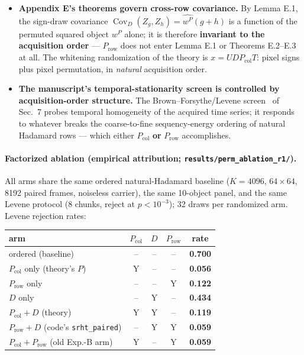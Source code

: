 \begin{itemize}
\item \textbf{Appendix E's theorems govern cross-row covariance.} By Lemma E.1, the sign-draw covariance $\operatorname{Cov}_D(Z_g,Z_h)=\widehat{w^P}(g+h)$ is a function of the permuted squared object $w^P$ alone; it is therefore \textbf{invariant to the acquisition order} --- $P_{\mathrm{row}}$ does not enter Lemma E.1 or Theorems E.2--E.3 at all. The whitening randomization of the theory is $x=UDP_{\mathrm{col}}T$: pixel signs plus pixel permutation, in \emph{natural} acquisition order.
\item \textbf{The manuscript's temporal-stationarity screen is controlled by acquisition-order structure.} The Brown--Forsythe/Levene screen~\cite{BrownForsythe1974,Levene1960} of Sec.~7 probes temporal homogeneity of the acquired time series; it responds to whatever breaks the coarse-to-fine sequency-energy ordering of natural Hadamard rows --- which either $P_{\mathrm{col}}$ \textbf{or} $P_{\mathrm{row}}$ accomplishes.
\end{itemize}

\paragraph{Factorized ablation (empirical attribution; \texttt{results/perm\_ablation\_r1/}).} All arms share the same ordered natural-Hadamard baseline ($K=4096$, $64\times64$, 8192 paired frames, noiseless carrier), the same 10-object panel, and the same Levene protocol (8 chunks, reject at $p<10^{-3}$); 32 draws per randomized arm. Levene rejection rates:

\begin{center}
\small
\setlength{\tabcolsep}{4.5pt}%
\begin{tabular}{lcccc}
\toprule
arm & $P_{\mathrm{col}}$ & $D$ & $P_{\mathrm{row}}$ & rate \\
\midrule
ordered (baseline) & -- & -- & -- & \textbf{0.700} \\
$P_{\mathrm{col}}$ only (theory's $P$) & Y & -- & -- & \textbf{0.056} \\
$P_{\mathrm{row}}$ only & -- & -- & Y & \textbf{0.122} \\
$D$ only & -- & Y & -- & \textbf{0.434} \\
$P_{\mathrm{col}}+D$ (theory) & Y & Y & -- & \textbf{0.119} \\
$P_{\mathrm{row}}+D$ (code's \texttt{srht\_paired}) & -- & Y & Y & \textbf{0.059} \\
$P_{\mathrm{col}}+P_{\mathrm{row}}$ (old Exp.-B arm) & Y & -- & Y & \textbf{0.059} \\
\bottomrule
\end{tabular}
\end{center}

